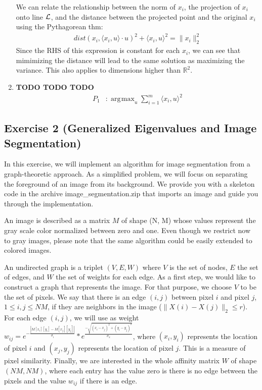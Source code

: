 \documentclass[11pt]{article}
\DeclareMathOperator*{\argmax}{arg\!max}
\begin{document}
\begin{solution}
\begin{enumerate}
    We can relate the relationship between the norm of $x_i$, the projection of $x_i$ onto line $\cal L$, and the distance between the projected point and the original $x_i$ using the Pythagorean thm:
    \begin{align*}
        dist(x_i, \langle x_i,u \rangle \cdot u)^2 + \langle x_i,u \rangle^2 = \|x_i\|_2^2
    \end{align*}
        Since the RHS of this expression is constant for each $x_i$, we can see that mimimizing the distance will lead to the same solution as maximizing the variance. This also applies to dimensions higher than $\mathbb{R}^2$.

\item \textbf{TODO TODO TODO}
\begin{align*}
    P_1&: \argmax_u \sum_{i=1}^m \langle x_i,u \rangle^2
\end{align*}
\end{enumerate}
\end{solution}

\newpage
\subsection*{Exercise 2 (Generalized Eigenvalues and Image Segmentation)}

In this exercise, we will implement an algorithm for image segmentation from a graph-theoretic approach. As a simplified problem, we will focus on separating the foreground of an image from its background. We provide you with a skeleton code in the archive image\_segmentation.zip that imports an image and guide you through the implementation.

An image is described as a matrix $M$ of shape (N, M) whose values represent the gray scale color normalized between zero and one. Even though we restrict now to gray images, please note that the same algorithm could be easily extended to colored images.

An undirected graph is a triplet $(V, E, W)$ where $V$ is the set of nodes, $E$ the set of edges, and $W$ the set of weights for each edge. As a first step, we would like to construct a graph that represents the image. For that purpose, we choose $V$ to be the set of pixels. We say that there is an edge $(i, j)$ between pixel $i$ and pixel $j$, $1 \leq i, j \leq NM$, if they are neighbors in the image ($\|X(i) - X(j) \|_2 \leq r$). For each edge $(i, j)$, we will use as weight $w_{ij} = e^{-\frac{|M[x_i][y_i] - M[x_j][y_j]|}{\sigma_i}} * e^{\frac{-\sqrt{(x_i - x_j)^2 + (y_i - y_j)^2}}{\sigma_x}}$, where $(x_i, y_i)$ represents the location of pixel $i$ and $(x_j, y_j)$ represents the location of pixel $j$. This is a measure of pixel similarity. Finally, we are interested in the whole affinity matrix $W$ of shape $(NM, NM)$, where each entry has the value zero is there is no edge between the pixels and the value $w_{ij}$ if there is an edge.
\end{document}
